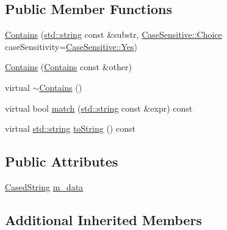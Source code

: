 \subsection*{Public Member Functions}
\begin{DoxyCompactItemize}
\item 
\hyperlink{struct_catch_1_1_matchers_1_1_impl_1_1_std_string_1_1_contains_a7a062d83bd3e3075929dbb55e1c24258}{Contains} (\hyperlink{_s_d_l__opengl__glext_8h_ae84541b4f3d8e1ea24ec0f466a8c568b}{std\+::string} const \&substr, \hyperlink{struct_catch_1_1_case_sensitive_aad49d3aee2d97066642fffa919685c6a}{Case\+Sensitive\+::\+Choice} case\+Sensitivity=\hyperlink{struct_catch_1_1_case_sensitive_aad49d3aee2d97066642fffa919685c6aa7c5550b69ec3c502e6f609b67f9613c6}{Case\+Sensitive\+::\+Yes})
\item 
\hyperlink{struct_catch_1_1_matchers_1_1_impl_1_1_std_string_1_1_contains_ad6b1ef653dfcb3bab43c43be043dc4e8}{Contains} (\hyperlink{struct_catch_1_1_matchers_1_1_impl_1_1_std_string_1_1_contains}{Contains} const \&other)
\item 
virtual \hyperlink{struct_catch_1_1_matchers_1_1_impl_1_1_std_string_1_1_contains_ae7a327dca00ff985b69b39bc883b7cb2}{$\sim$\+Contains} ()
\item 
virtual bool \hyperlink{struct_catch_1_1_matchers_1_1_impl_1_1_std_string_1_1_contains_aa27d823dea5770025a24424fc3355a6f}{match} (\hyperlink{_s_d_l__opengl__glext_8h_ae84541b4f3d8e1ea24ec0f466a8c568b}{std\+::string} const \&expr) const 
\item 
virtual \hyperlink{_s_d_l__opengl__glext_8h_ae84541b4f3d8e1ea24ec0f466a8c568b}{std\+::string} \hyperlink{struct_catch_1_1_matchers_1_1_impl_1_1_std_string_1_1_contains_a226755351f3598179925f3ab89d6def7}{to\+String} () const 
\end{DoxyCompactItemize}
\subsection*{Public Attributes}
\begin{DoxyCompactItemize}
\item 
\hyperlink{struct_catch_1_1_matchers_1_1_impl_1_1_std_string_1_1_cased_string}{Cased\+String} \hyperlink{struct_catch_1_1_matchers_1_1_impl_1_1_std_string_1_1_contains_a419a9ecaeaa417d4987982402e08b3eb}{m\+\_\+data}
\end{DoxyCompactItemize}
\subsection*{Additional Inherited Members}


